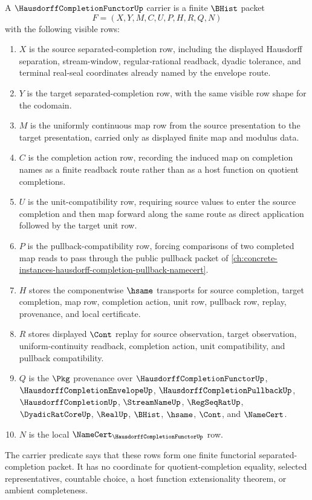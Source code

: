 \begin{definition}
\label{def:hausdorff-completion-functor-carrier}
A $\HausdorffCompletionFunctorUp$ carrier is a finite $\BHist$ packet
$$
F=(X,Y,M,C,U,P,H,R,Q,N)
$$
with the following visible rows:
\begin{enumerate}
\item $X$ is the source separated-completion row, including the displayed Hausdorff separation, stream-window, regular-rational readback, dyadic tolerance, and terminal real-seal coordinates already named by the envelope route.
\item $Y$ is the target separated-completion row, with the same visible row shape for the codomain.
\item $M$ is the uniformly continuous map row from the source presentation to the target presentation, carried only as displayed finite map and modulus data.
\item $C$ is the completion action row, recording the induced map on completion names as a finite readback route rather than as a host function on quotient completions.
\item $U$ is the unit-compatibility row, requiring source values to enter the source completion and then map forward along the same route as direct application followed by the target unit row.
\item $P$ is the pullback-compatibility row, forcing comparisons of two completed map reads to pass through the public pullback packet of \autoref{ch:concrete-instances-hausdorff-completion-pullback-namecert}.
\item $H$ stores the componentwise $\hsame$ transports for source completion, target completion, map row, completion action, unit row, pullback row, replay, provenance, and local certificate.
\item $R$ stores displayed $\Cont$ replay for source observation, target observation, uniform-continuity readback, completion action, unit compatibility, and pullback compatibility.
\item $Q$ is the $\Pkg$ provenance over $\HausdorffCompletionFunctorUp$, $\HausdorffCompletionEnvelopeUp$, $\HausdorffCompletionPullbackUp$, $\HausdorffCompletionUp$, $\StreamNameUp$, $\RegSeqRatUp$, $\DyadicRatCoreUp$, $\RealUp$, $\BHist$, $\hsame$, $\Cont$, and $\NameCert$.
\item $N$ is the local $\NameCert_{\HausdorffCompletionFunctorUp}$ row.
\end{enumerate}
The carrier predicate says that these rows form one finite functorial separated-completion packet. It has no coordinate for quotient-completion equality, selected representatives, countable choice, a host function extensionality theorem, or ambient completeness.
\end{definition}

